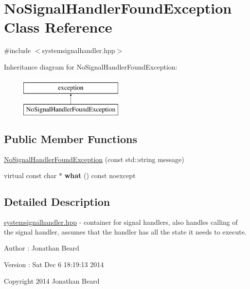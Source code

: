 \hypertarget{class_no_signal_handler_found_exception}{}\section{No\+Signal\+Handler\+Found\+Exception Class Reference}
\label{class_no_signal_handler_found_exception}


{\ttfamily \#include $<$systemsignalhandler.\+hpp$>$}

Inheritance diagram for No\+Signal\+Handler\+Found\+Exception\+:\begin{figure}[H]
\begin{center}
\leavevmode
\includegraphics[height=2.000000cm]{class_no_signal_handler_found_exception}
\end{center}
\end{figure}
\subsection*{Public Member Functions}
\begin{DoxyCompactItemize}
\item 
\hyperlink{class_no_signal_handler_found_exception_aedbbde0eab386ffcef936bb04da96862}{No\+Signal\+Handler\+Found\+Exception} (const std\+::string message)
\item 
\hypertarget{class_no_signal_handler_found_exception_a1c69821c8191a464a7793735cac3d265}{}virtual const char $\ast$ {\bfseries what} () const  noexcept\label{class_no_signal_handler_found_exception_a1c69821c8191a464a7793735cac3d265}

\end{DoxyCompactItemize}


\subsection{Detailed Description}
\hyperlink{systemsignalhandler_8hpp_source}{systemsignalhandler.\+hpp} -\/ container for signal handlers, also handles calling of the signal handler, assumes that the handler has all the state it needs to execute.

\begin{DoxyAuthor}{Author}
\+: Jonathan Beard 
\end{DoxyAuthor}
\begin{DoxyVersion}{Version}
\+: Sat Dec 6 18\+:19\+:13 2014
\end{DoxyVersion}
Copyright 2014 Jonathan Beard

